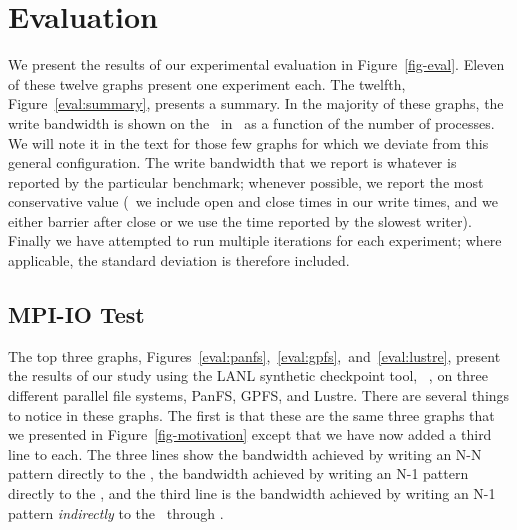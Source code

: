 \section{Evaluation}
\label{eval}



We present the results of our experimental evaluation in Figure~\ref{fig-eval}.
Eleven of these twelve graphs present one experiment each. The twelfth,
Figure~\ref{eval:summary}, presents a summary. In the majority of these graphs,
the write bandwidth is shown on the \yaxis\ in \MBs\ as a function of the
number of processes. We will note it in the text for those few graphs for
which we deviate from this general configuration. The write bandwidth that we
report is whatever is reported by the particular benchmark; whenever possible,
we report the most conservative value (\ie\ we include open and close times in
our write times, and we either barrier after close or we use the time reported
by the slowest writer). Finally we have attempted to run multiple iterations
for each experiment; where applicable, the standard deviation is therefore
included.

\subsection{MPI-IO Test}

The top three graphs, 
Figures~\ref{eval:panfs},~\ref{eval:gpfs},~and~\ref{eval:lustre}, present the
results of our study using the LANL synthetic checkpoint tool, ~\cite{mpi-io-test}, on three different parallel file systems, PanFS, GPFS,
and Lustre. 
There are several things to notice in these graphs. The first is that these
are the same three graphs that we presented in Figure~\ref{fig-motivation}
except that we have now added a third line to each. The three lines show the
bandwidth achieved by writing an N-N pattern directly to the \upfs, the
bandwidth achieved by writing an N-1 pattern directly to the \upfs, and the
third line is the bandwidth achieved by writing an N-1 pattern {\em indirectly}
to the \upfs\ through \plfs.

